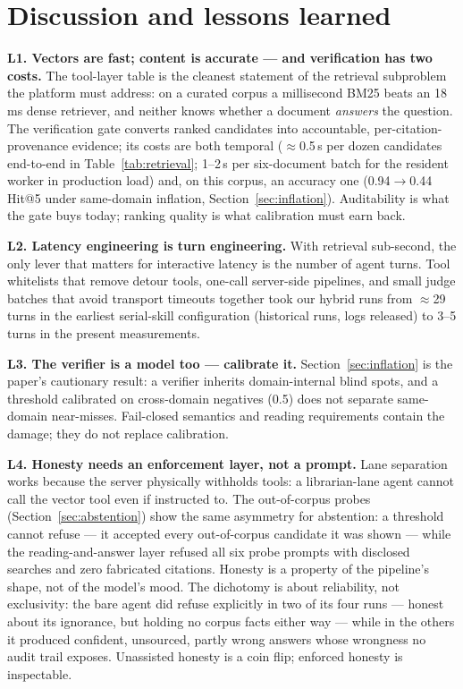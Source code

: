 \section{Discussion and lessons learned}
\label{sec:discussion}

\textbf{L1. Vectors are fast; content is accurate --- and verification has
two costs.} The tool-layer table is the cleanest statement of the retrieval
subproblem the platform must address: on a curated corpus a millisecond
BM25 beats an 18\,ms dense retriever, and neither knows whether a document
\emph{answers} the question. The verification gate converts ranked
candidates into accountable, per-citation-provenance evidence; its costs
are both temporal ($\approx$0.5\,s per dozen candidates end-to-end in
Table~\ref{tab:retrieval}; 1--2\,s per six-document batch for the
resident worker in production load) and, on this corpus, an accuracy one
(0.94$\to$0.44 Hit@5 under same-domain inflation,
Section~\ref{sec:inflation}). Auditability is what the gate buys today;
ranking quality is what calibration must earn back.

\textbf{L2. Latency engineering is turn engineering.} With retrieval
sub-second, the only lever that matters for interactive latency is the
number of agent turns. Tool whitelists that remove detour tools, one-call
server-side pipelines, and small judge batches that avoid transport
timeouts together took our hybrid runs from $\approx$29 turns in the
earliest serial-skill configuration (historical runs, logs released) to
3--5 turns in the present measurements.


\textbf{L3. The verifier is a model too --- calibrate it.}
Section~\ref{sec:inflation} is the paper's cautionary result: a verifier
inherits domain-internal blind spots, and a threshold calibrated on
cross-domain negatives (0.5) does not separate same-domain near-misses.
Fail-closed semantics and reading requirements contain the damage; they do
not replace calibration.

\textbf{L4. Honesty needs an enforcement layer, not a prompt.} Lane
separation works because the server physically withholds tools: a
librarian-lane agent cannot call the vector tool even if instructed to.
The out-of-corpus probes (Section~\ref{sec:abstention}) show the same
asymmetry for abstention: a threshold cannot refuse --- it accepted every
out-of-corpus candidate it was shown --- while the reading-and-answer
layer refused all six probe prompts with disclosed searches and zero
fabricated citations. Honesty is a property of the pipeline's shape, not
of the model's mood. The dichotomy is about reliability, not exclusivity:
the bare agent did refuse explicitly in two of its four runs --- honest
about its ignorance, but holding no corpus facts either way --- while in
the others it produced confident, unsourced, partly wrong answers whose
wrongness no audit trail exposes. Unassisted honesty is a coin flip;
enforced honesty is inspectable.


